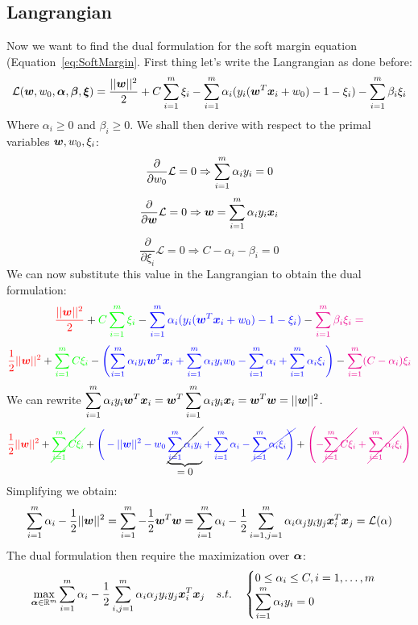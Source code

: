 \subsection{Langrangian}
Now we want to find the dual formulation for the soft margin equation (Equation~\ref{eq:SoftMargin}. First thing let's write the Langrangian as done before:
\[
  \mathcal{L}(\bm{w},w_0,\bm{\alpha},\bm{\beta},\bm{\xi})=\frac{\vert\vert \bm{w}\vert\vert^2}{2}+C\displaystyle\sum_{i=1}^m\xi_i-\displaystyle\sum_{i=1}^m\alpha_i(y_i(\bm{w}^T\bm{x}_i+w_0)-1-\xi_i)-\displaystyle\sum_{i=1}^m\beta_i\xi_i 
\]
Where $\alpha_i\geq0$ and $\beta_i\geq0$. \newline
We shall then derive with respect to the primal variables $\bm{w}, w_0, \xi_i$:
\[\frac{\partial}{\partial{w_0}}\mathcal{L}=0\Rightarrow\displaystyle\sum_{i=1}^m\alpha_iy_i=0\]
\[\frac{\partial}{\partial{\bm{w}}}\mathcal{L}=0\Rightarrow \bm{w}=\displaystyle\sum_{i=1}^m\alpha_iy_i\bm{x}_i\]
\[\frac{\partial}{\partial{\xi_i}}\mathcal{L}=0\Rightarrow C-\alpha_i-\beta_i=0\]
We can now substitute this value in the Langrangian to obtain the dual formulation:
\[
  \textcolor{red}{\frac{\vert\vert \bm{w}\vert\vert^2}{2}}+
  \textcolor{green}{C\displaystyle\sum_{i=1}^m\xi_i}-
  \textcolor{blue}{\displaystyle\sum_{i=1}^m\alpha_i(y_i(\bm{w}^T\bm{x}_i+w_0)-1-\xi_i)}-
  \textcolor{magenta}{\displaystyle\sum_{i=1}^m\beta_i\xi_i=}
\]
\[
  \textcolor{red}{\frac{1}{2}\vert\vert\bm{w}\vert\vert^2}+
  \textcolor{green}{\displaystyle\sum_{i=1}^mC\xi_i}-
  \textcolor{blue}{\left(\displaystyle\sum_{i=1}^m\alpha_iy_i\bm{w}^T\bm{x}_i+\displaystyle\sum_{i=1}^m\alpha_iy_iw_0-\displaystyle\sum_{i=1}^m\alpha_i+\displaystyle\sum_{i=1}^m\alpha_i\xi_i \right)}-
  \textcolor{magenta}{\displaystyle\sum_{i=1}^m(C-\alpha_i)\xi_i}
\]
We can rewrite $\displaystyle\sum_{i=1}^m\alpha_iy_i\bm{w}^T\bm{x}_i=\bm{w}^T\displaystyle\sum_{i=1}^m\alpha_iy_i\bm{x}_i=\bm{w}^T\bm{w}=\vert\vert\bm{w}\vert\vert^2$. 
\[
  \textcolor{red}{\frac{1}{2}\vert\vert\vect{w}\vert\vert^2}+
  \textcolor{green}{\cancel{\Sum_{i=1}^mC\xi_i}}+
  \textcolor{blue}{\Bigg(-\vert\vert\vect{w}\vert\vert^2-w_0}
  \underbrace{\cancel{\textcolor{blue}{\Sum_{i=1}^m\alpha_iy_i}} \rule[-12pt]{0pt}{5pt}}_{\mbox{$=0$}}
  \textcolor{blue}{+\Sum_{i=1}^m\alpha_i-\cancel{\Sum_{i=1}^m\alpha_i\xi_i \Bigg)}}+
  \textcolor{magenta}{\left(-\cancel{\Sum_{i=1}^mC\xi_i}+\cancel{\Sum_{i=1}^m\alpha_i\xi_i}\right)}
\]
Simplifying we obtain:
\[\displaystyle\sum_{i=1}^m\alpha_i-\frac{1}{2}\vert\vert\bm{w}\vert\vert^2=\displaystyle\sum_{i=1}^m-\frac{1}{2}\bm{w}^T\bm{w}=\displaystyle\sum_{i=1}^m\alpha_i-\frac{1}{2}\displaystyle\sum_{i=1,j=1}^m\alpha_i\alpha_jy_iy_j\bm{x}_i^T\bm{x}_j=\mathcal{L}(\alpha)\]
The dual formulation then require the maximization over $\bm{\alpha}$:
\begin{equation}
  \max\limits_{\bm{\alpha}\in\mathbb{R}^m}\displaystyle\sum_{i=1}^m\alpha_i-\frac{1}{2}\displaystyle\sum_{i,j=1}^m\alpha_i\alpha_jy_iy_j\bm{x}_i^T\bm{x}_j\quad s.t.\quad 
\begin{cases}
  0\leq \alpha_i\leq C, i=1,\hdots, m\\
  \displaystyle\sum_{i=1}^m\alpha_iy_i=0
\end{cases}
\end{equation}
